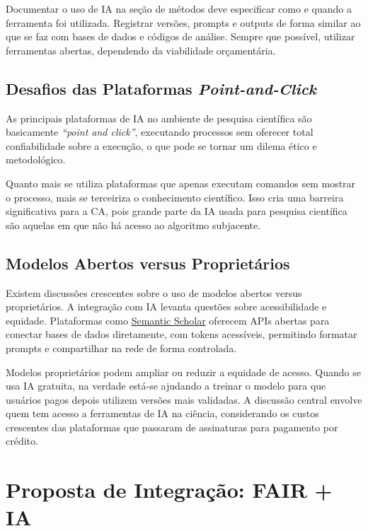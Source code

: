 \documentclass[
  a4paper,
]{book}
\begin{document}
Documentar o uso de IA na seção de métodos deve especificar como e
quando a ferramenta foi utilizada. Registrar versões, prompts e outputs
de forma similar ao que se faz com bases de dados e códigos de análise.
Sempre que possível, utilizar ferramentas abertas, dependendo da
viabilidade orçamentária.

\subsection{\texorpdfstring{Desafios das Plataformas
\emph{Point-and-Click}}{Desafios das Plataformas Point-and-Click}}\label{desafios-das-plataformas-point-and-click}

As principais plataformas de IA no ambiente de pesquisa científica são
basicamente \emph{``point and click''}, executando processos sem
oferecer total confiabilidade sobre a execução, o que pode se tornar um
dilema ético e metodológico.

Quanto mais se utiliza plataformas que apenas executam comandos sem
mostrar o processo, mais se terceiriza o conhecimento científico. Isso
cria uma barreira significativa para a CA, pois grande parte da IA usada
para pesquisa científica são aquelas em que não há acesso ao algoritmo
subjacente.

\subsection{Modelos Abertos versus
Proprietários}\label{modelos-abertos-versus-proprietuxe1rios}

Existem discussões crescentes sobre o uso de modelos abertos versus
proprietários. A integração com IA levanta questões sobre acessibilidade
e equidade. Plataformas como
\href{https://www.semanticscholar.org/}{Semantic Scholar} oferecem APIs
abertas para conectar bases de dados diretamente, com tokens acessíveis,
permitindo formatar prompts e compartilhar na rede de forma controlada.

Modelos proprietários podem ampliar ou reduzir a equidade de acesso.
Quando se usa IA gratuita, na verdade está-se ajudando a treinar o
modelo para que usuários pagos depois utilizem versões mais validadas. A
discussão central envolve quem tem acesso a ferramentas de IA na
ciência, considerando os custos crescentes das plataformas que passaram
de assinaturas para pagamento por crédito.

\section{Proposta de Integração: FAIR +
IA}\label{proposta-de-integrauxe7uxe3o-fair-ia}
\end{document}
